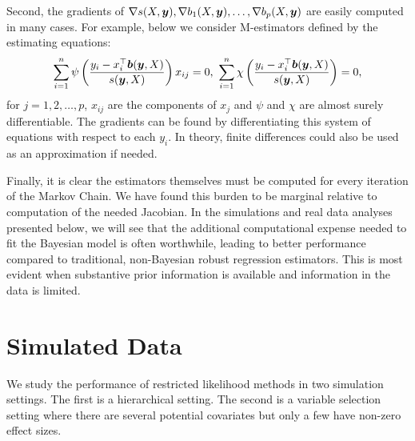 \documentclass[ba]{imsart}
\newcommand{\by}{\mbox{\boldmath $y$}}
\newcommand{\bb}{\mbox{\boldmath $b$}}
\newcommand{\response}[1]{{\color{blue}#1}}
\begin{document}
Second, the gradients of $\nabla s(X,\by), \nabla b_1(X,\by),\dots, \nabla b_p(X,\by)$ are easily computed in many cases. For example, below we consider M-estimators defined by the estimating equations:
\begin{eqnarray}
\label{Mest}
 \sum_{i=1}^n \psi\left(\frac{y_i - x_{i}^{\top}\bb(\by,X)}{s(\by,X)}\right) x_{ij}=0, \
 \sum_{i=1}^n \chi\left(\frac{y_i - x_{i}^{\top}\bb(\by,X)}{s(\by,X)}\right)=0, 
 \end{eqnarray} 
for $j = 1, 2, \dots, p$, $x_{ij}$ are the components of $x_{j}$ and  $\psi$ and $\chi$ are almost surely differentiable. The gradients can be found by differentiating this system of equations with respect to each $y_{i}$. In theory, finite differences could also be used as an approximation if needed. 

\response{Finally, it is clear the estimators themselves must be computed for every iteration of the Markov Chain. We have found this burden to be marginal relative to computation of the needed Jacobian. In the simulations and real data analyses presented below, we will see that the additional computational expense needed to fit the Bayesian model is often worthwhile, leading to better performance compared to traditional, non-Bayesian robust regression estimators.  This is most evident when substantive prior information is available and information in the data is limited.}

%
%

\section{Simulated Data}
\label{simData}
We study the performance of restricted likelihood methods in two simulation settings. The first is a hierarchical setting. The second is a variable selection setting where there are several potential covariates but only a few have non-zero effect sizes.
\end{document}

